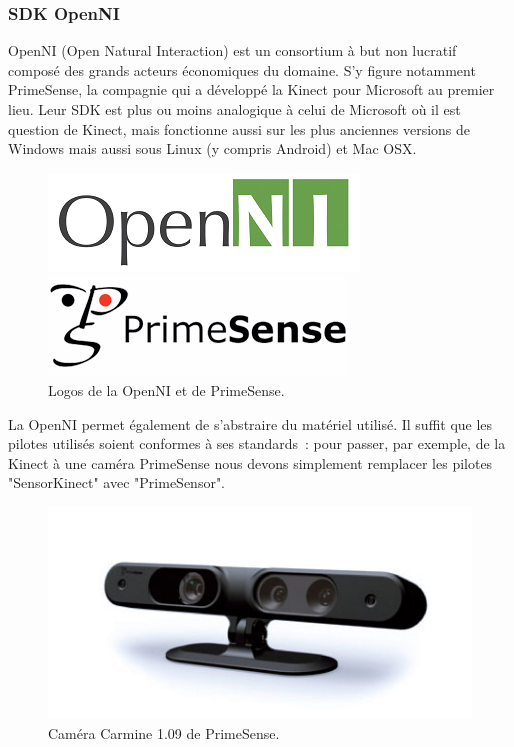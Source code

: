 \subsubsection{SDK OpenNI}
OpenNI (Open Natural Interaction) est un consortium à but non lucratif composé
des grands acteurs économiques du domaine. S'y figure notamment PrimeSense, la 
compagnie qui a développé la Kinect pour Microsoft au premier lieu. Leur SDK
est plus ou moins analogique à celui de Microsoft où il est question de
Kinect, mais fonctionne aussi sur les plus anciennes 
versions de Windows mais
aussi sous Linux (y compris Android) et Mac OSX.
\begin{figure}[h!]
\begin{minipage}{0.49\linewidth}
  \centering
  \includegraphics[width=0.9\linewidth]{images/openni_logo}
\end{minipage}
\begin{minipage}{0.49\linewidth}
  \centering
  \includegraphics[width=0.9\linewidth]{images/primesense_logo}
\end{minipage}

\caption{Logos de la OpenNI et de PrimeSense.}
\end{figure}
La OpenNI permet également de s'abstraire du matériel utilisé. Il suffit que
les pilotes utilisés soient conformes à ses standards~: pour passer, par 
exemple, de la Kinect à une caméra PrimeSense nous devons simplement remplacer 
les pilotes "SensorKinect" avec "PrimeSensor".
\begin{figure}[h!]
\centering
\includegraphics[width=0.6\linewidth]{images/primesense_camera}
\caption{Caméra Carmine 1.09 de PrimeSense.}
\end{figure}

